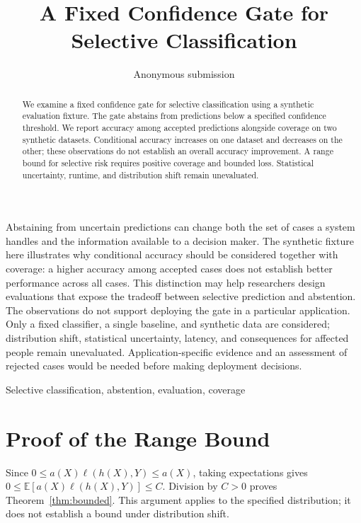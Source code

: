 \documentclass[journal]{IEEEtai}
\title{A Fixed Confidence Gate for Selective Classification}
\author{Anonymous submission}
\begin{document}
\maketitle
\begin{abstract}
We examine a fixed confidence gate for selective classification using a synthetic
evaluation fixture. The gate abstains from predictions below a specified confidence
threshold. We report accuracy among accepted predictions alongside coverage on two
synthetic datasets. Conditional accuracy increases on one dataset and decreases on
the other; these observations do not establish an overall accuracy improvement.
A range bound for selective risk requires positive coverage and bounded loss.
Statistical uncertainty, runtime, and distribution shift remain unevaluated.
\end{abstract}
\begin{IEEEImpStatement}
Abstaining from uncertain predictions can change both the set of cases a system
handles and the information available to a decision maker. The synthetic fixture
here illustrates why conditional accuracy should be considered together with
coverage: a higher accuracy among accepted cases does not establish better
performance across all cases. This distinction may help researchers design
evaluations that expose the tradeoff between selective prediction and abstention.
The observations do not support deploying the gate in a particular application.
Only a fixed classifier, a single baseline, and synthetic data are considered;
distribution shift, statistical uncertainty, latency, and consequences for affected
people remain unevaluated. Application-specific evidence and an assessment of
rejected cases would be needed before making deployment decisions.
\end{IEEEImpStatement}
\begin{IEEEkeywords}Selective classification, abstention, evaluation, coverage\end{IEEEkeywords}


\appendices
\section{Proof of the Range Bound}\label{app:proof}
Since $0\leq a(X)\ell(h(X),Y)\leq a(X)$, taking expectations gives
$0\leq\mathbb{E}[a(X)\ell(h(X),Y)]\leq C$. Division by $C>0$ proves
Theorem~\ref{thm:bounded}. This argument applies to the specified distribution;
it does not establish a bound under distribution shift.
\end{document}
